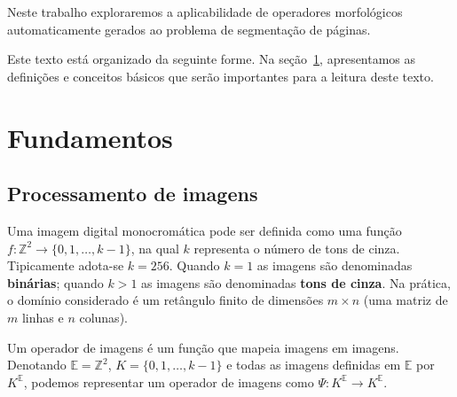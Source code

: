 \documentclass[a4paper,11pt]{article}
\begin{document}
Neste trabalho exploraremos a aplicabilidade de operadores
morfológicos automaticamente gerados ao problema de segmentação de
páginas.

Este texto está organizado da seguinte forme. Na seção~\ref{sec:fundamentos},
apresentamos as definições e conceitos básicos que serão importantes
para a leitura deste texto.





\section{Fundamentos}
\label{sec:fundamentos}

\subsection{Processamento de imagens}
Uma imagem digital monocromática pode ser definida como uma função $f:
\mathbb{Z}^2 \to \{0,1,\ldots,k-1\}$, na qual $k$ representa o número
  de tons de cinza. Tipicamente adota-se $k=256$. Quando $k=1$ as
  imagens são denominadas {\bf binárias}; quando $k>1$ as imagens são
  denominadas {\bf tons de cinza}. Na prática, o domínio considerado é
  um retângulo finito de dimensões $m\times n$ (uma matriz de $m$
  linhas e $n$ colunas). 

Um operador de imagens é um função que mapeia imagens em
imagens. Denotando $\mathbb{E}=\mathbb{Z}^2$, $K=\{0,1,\ldots,k-1\}$ e
todas as imagens definidas em $\mathbb{E}$ por $K^{\mathbb{E}}$,
  podemos representar um operador de imagens como $\Psi: K^{\mathbb{E}}
    \to K^{\mathbb{E}}$.
\end{document}
